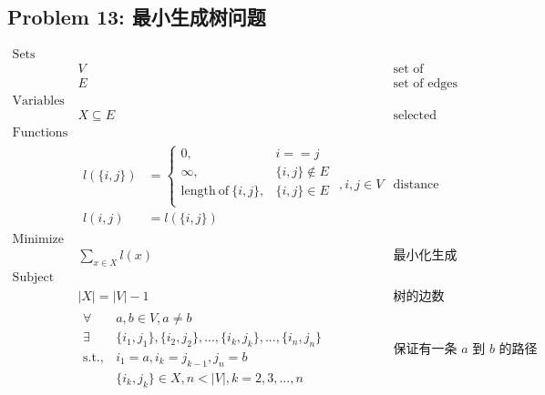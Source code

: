 \documentclass[11pt]{article}
\begin{document}
\newpage
\subsection*{Problem 13: 最小生成树问题}

\begin{eqnarray*}
    \textrm{Sets} \\
        & V & \textrm{set of vertices} \\
        & E & \textrm{set of edges} \\
    \textrm{Variables} \\
        & X \subseteq E & \textrm{selected edges} \\
    \textrm{Functions} \\
        & \begin{array}{rl}
            l(\{i, j\}) &= \left\{
                \begin{array}{ll}
                    0,                              & i == j \\
                    \infty,                         & \{i, j\} \notin E \\
                    \mathrm{length\ of\ }\{i, j\},  & \{i, j\} \in E \\
                \end{array}
            \right. \\
            l(i, j) &= l(\{i, j\})
        \end{array}, i, j \in V & \textrm{distance between vertices} \\
    \textrm{Minimize} \\
        & \displaystyle \sum_{x \in X} l(x) & \textrm{最小化生成树路径长度} \\
    \textrm{Subject to} \\
        & |X| = |V| - 1 & \textrm{树的边数} \\
        & \begin{array}{rl}
            \forall & a, b \in V, a \neq b \\
            \exists & \{i_1, j_1\}, \{i_2, j_2\}, ..., \{i_k, j_k\}, ..., \{i_n, j_n\} \\
            \mathrm{s.t.,} & i_1 = a, i_k = j_{k-1}, j_n = b \\
                    & \{i_k, j_k\} \in X, n < |V|, k = 2, 3, ..., n
        \end{array} & \textrm{保证有一条 $a$ 到 $b$ 的路径} \\ 
\end{eqnarray*}
\end{document}
